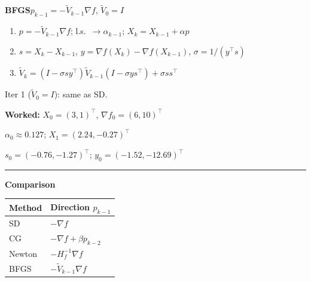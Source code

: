 \documentclass[10pt]{article}
\newlength{\mpw}
\begin{document}
\begin{minipage}[t]{\mpw}\vspace{0pt}
  \textbf{BFGS}\quad $p_{k-1}=-\tilde{V}_{k-1}\nabla f$,\; $\tilde{V}_0=I$
  \begin{enumerate}\setlength\itemsep{1pt}\setlength\topsep{2pt}
    \item $p=-\tilde{V}_{k-1}\nabla f$;\; l.s.\ $\to\alpha_{k-1}$;\; $X_k=X_{k-1}+\alpha p$
    \item $s=X_k-X_{k-1}$,\; $y=\nabla f(X_k)-\nabla f(X_{k-1})$,\; $\sigma=1/(y^\top s)$
    \item $\tilde{V}_k=(I{-}\sigma sy^\top)\tilde{V}_{k-1}(I{-}\sigma ys^\top)+\sigma ss^\top$
  \end{enumerate}
  Iter 1 ($\tilde{V}_0=I$): same as SD.

  \smallskip
  \textbf{Worked:} $X_0=(3,1)^\top$, $\nabla f_0=(6,10)^\top$

  $\alpha_0\approx0.127$;\; $X_1=(2.24,-0.27)^\top$

  $s_0=(-0.76,-1.27)^\top$;\; $y_0=(-1.52,-12.69)^\top$

  \medskip\hrule\smallskip
  \textbf{Comparison}

  \begin{tabular}{@{}ll@{}}
    \toprule
    Method & Direction $p_{k-1}$ \\
    \midrule
    SD   & $-\nabla f$ \\
    CG   & $-\nabla f+\beta p_{k-2}$ \\
    Newton & $-H_f^{-1}\nabla f$ \\
    BFGS & $-\tilde{V}_{k-1}\nabla f$ \\
    \bottomrule
  \end{tabular}
\end{minipage}

\newpage

\end{document}
